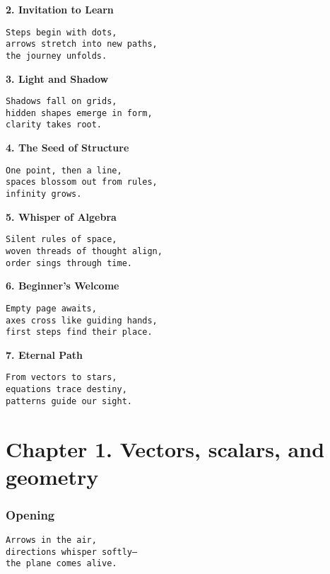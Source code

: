 \documentclass[
  letterpaper,
  DIV=11,
  numbers=noendperiod]{scrreprt}
\begin{document}
\textbf{2. Invitation to Learn}

\begin{verbatim}
Steps begin with dots,
arrows stretch into new paths,
the journey unfolds.
\end{verbatim}

\textbf{3. Light and Shadow}

\begin{verbatim}
Shadows fall on grids,
hidden shapes emerge in form,
clarity takes root.
\end{verbatim}

\textbf{4. The Seed of Structure}

\begin{verbatim}
One point, then a line,
spaces blossom out from rules,
infinity grows.
\end{verbatim}

\textbf{5. Whisper of Algebra}

\begin{verbatim}
Silent rules of space,
woven threads of thought align,
order sings through time.
\end{verbatim}

\textbf{6. Beginner's Welcome}

\begin{verbatim}
Empty page awaits,
axes cross like guiding hands,
first steps find their place.
\end{verbatim}

\textbf{7. Eternal Path}

\begin{verbatim}
From vectors to stars,
equations trace destiny,
patterns guide our sight.
\end{verbatim}

\newpage

\section{Chapter 1. Vectors, scalars, and
geometry}\label{chapter-1.-vectors-scalars-and-geometry-1}

\subsubsection{Opening}\label{opening}

\begin{verbatim}
Arrows in the air,
directions whisper softly—
the plane comes alive.
\end{verbatim}
\end{document}
